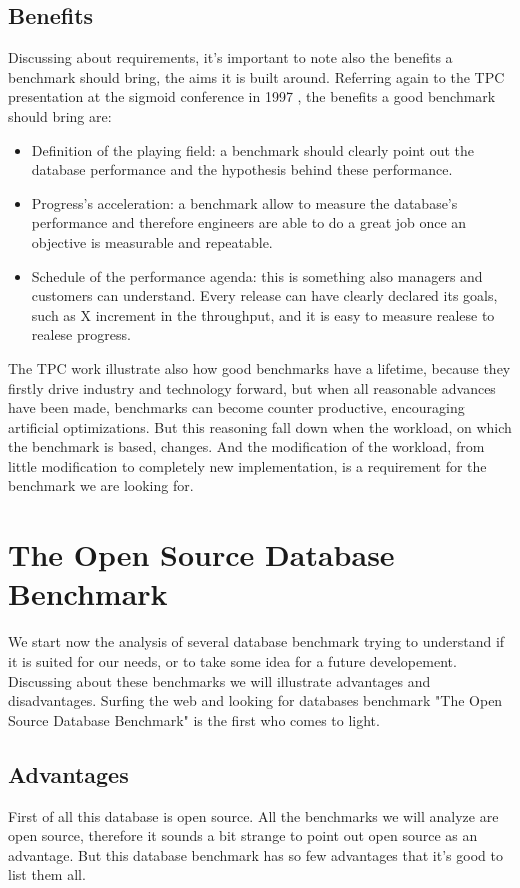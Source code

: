 		\subsection{Benefits}
Discussing about requirements, it's important to note also the benefits a benchmark should bring, the aims it is built around. Referring again to the TPC presentation at the sigmoid conference in 1997 \cite{tpc/sigmoid}, the benefits a good benchmark should bring are:
\begin{itemize}
	\item Definition of the playing field: a benchmark should clearly point out the database performance and the hypothesis behind these performance.
	\item Progress's acceleration: a benchmark allow to measure the database's performance and therefore engineers are able to do a great job once an objective is measurable and repeatable.
	\item Schedule of the performance agenda: this is something also managers and customers can understand. Every release can have clearly declared its goals, such as X increment in the throughput, and it is easy to measure realese to realese progress.
\end{itemize}

The TPC work illustrate also how good benchmarks have a lifetime, because they firstly drive industry and technology forward, but when all reasonable advances have been made, benchmarks can become counter productive, encouraging artificial optimizations. But this reasoning fall down when the workload, on which the benchmark is based, changes. And the modification of the workload, from little modification to completely new implementation, is a requirement for the benchmark we are looking for.
	
	\section{The Open Source Database Benchmark}
We start now the analysis of several database benchmark trying to understand if it is suited for our needs, or to take some idea for a future developement. Discussing about these benchmarks we will illustrate advantages and disadvantages. Surfing the web and looking for databases benchmark "The Open Source Database Benchmark" is the first who comes to light. 

		\subsection{Advantages}
First of all this database is open source. All the benchmarks we will analyze are open source, therefore it sounds a bit strange to point out open source as an advantage. But this database benchmark has so few advantages that it's good to list them all.


